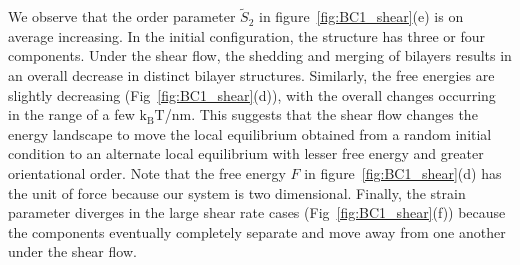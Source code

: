 \documentclass[prb,preprint,showpacs,preprintnumbers,amsmath,amssymb,longbibliography]{revtex4-1}
\begin{document}
We observe that the order parameter $\tilde S_2$ in figure~\ref{fig:BC1_shear}(e)
is on average increasing.  In the initial configuration,
the structure has three or four components.  
%
Under the shear flow, the shedding and merging of bilayers
results in an overall decrease in distinct bilayer structures.  
Similarly, the free energies 
are slightly decreasing (Fig~\ref{fig:BC1_shear}(d)),
with the overall changes occurring in the range of a few $\mathrm{k_BT}$/nm.  
This suggests that
the shear flow changes the energy landscape to move the local equilibrium obtained from a random initial condition
to an alternate local equilibrium with lesser free energy and greater orientational order.   
Note that the free energy $F$ in figure~\ref{fig:BC1_shear}(d) has the unit of force because our system is two dimensional.
%
%
Finally, the strain parameter diverges in the large shear rate cases (Fig~\ref{fig:BC1_shear}(f))
because the components eventually completely separate and move away from one another
under the shear flow.
\end{document}
